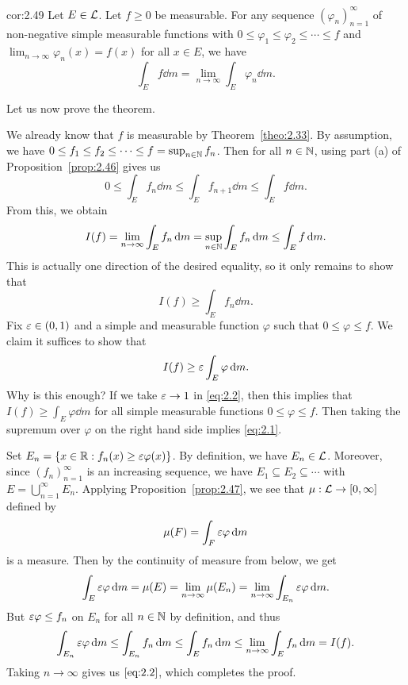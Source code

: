 \begin{cor}{cor:2.49}
    Let $E \in {\cal L}$. Let $f \geq 0$ be measurable. For any sequence 
    $(\varphi_n)_{n=1}^\infty$ of non-negative simple measurable functions 
    with $0 \leq \varphi_1 \leq \varphi_2 \leq \cdots \leq f$ and 
    $\lim_{n\to\infty} \varphi_n(x) = f(x)$ for all $x \in E$, we have 
    \[ \int_E f\dd m = \lim_{n\to\infty} \int_E \varphi_n \dd m. \] 
\end{cor}

Let us now prove the theorem. 

\begin{pf}
    We already know that $f$ is measurable by Theorem~\ref{theo:2.33}.
    By assumption, we have $0 \leq f_1 \leq f_2 \leq \cdots \leq f = 
    \sup_{n\in\mathbb{N}} f_n$. Then for all $n \in \mathbb{N}$, using part (a) of 
    Proposition~\ref{prop:2.46} gives us 
    \[ 0 \leq \int_E f_n\dd m \leq \int_E f_{n+1}\dd m \leq \int_E 
    f\dd m. \] 
    From this, we obtain 
    \[ I(f) = \lim_{n\to\infty} \int_E f_n\,\mathrm{d} m = \sup_{n\in\mathbb{N}} \int_E 
    f_n\,\mathrm{d} m \leq \int_E f\,\mathrm{d} m. \] 
    This is actually one direction of the desired equality, so 
    it only remains to show that 
    \begin{equation}\label{eq:2.1}
        I(f) \geq \int_E f_n\dd m.
    \end{equation} 
    Fix $\varepsilon \in (0, 1)$ and a simple and measurable function $\varphi$ 
    such that $0 \leq \varphi \leq f$. We claim it suffices to show that 
    \begin{equation}\label{eq:2.2}
        I(f) \geq \varepsilon \int_E \varphi\,\mathrm{d} m. 
    \end{equation}
    Why is this enough? If we take $\varepsilon \to 1$ in \eqref{eq:2.2}, 
    then this implies that $I(f) \geq \int_E \varphi\dd m$ for all 
    simple measurable functions $0 \leq \varphi \leq f$. Then taking 
    the supremum over $\varphi$ on the right hand side implies \eqref{eq:2.1}. 

    Set $E_n = \{x \in \mathbb{R} : f_n(x) \geq \varepsilon\varphi(x)\}$. By definition, we 
    have $E_n \in {\cal L}$. Moreover, since $(f_n)_{n=1}^\infty$ is an 
    increasing sequence, we have $E_1 \subseteq E_2 \subseteq \cdots$ 
    with $E = \bigcup_{n=1}^\infty E_n$. Applying Proposition~\ref{prop:2.47}, 
    we see that $\mu : {\cal L} \to [0, \infty]$ defined by 
    \[ \mu(F) = \int_F \varepsilon\varphi\,\mathrm{d} m \] 
    is a measure. Then by the continuity of measure from below, we get 
    \[ \int_E \varepsilon\varphi\,\mathrm{d} m = \mu(E) = \lim_{n\to\infty} \mu(E_n) 
    = \lim_{n\to\infty} \int_{E_n} \varepsilon\varphi\,\mathrm{d} m. \] 
    But $\varepsilon\varphi \leq f_n$ on $E_n$ for all $n \in \mathbb{N}$ by definition, 
    and thus 
    \[ \int_{E_n} \varepsilon\varphi\,\mathrm{d} m \leq \int_{E_n} f_n\,\mathrm{d} m 
    \leq \int_E f_n\,\mathrm{d} m \leq \lim_{n\to\infty} \int_E f_n\,\mathrm{d} m = I(f). \] 
    Taking $n \to \infty$ gives us $\eqref{eq:2.2}$, which completes the proof. 
\end{pf}

